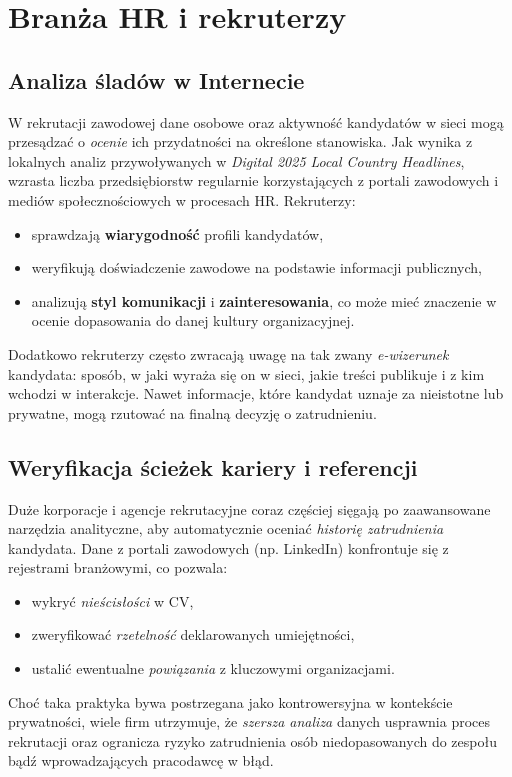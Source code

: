 \vspace{1em}

\section{Branża HR i rekruterzy}

\subsection{Analiza śladów w Internecie}
W rekrutacji zawodowej dane osobowe oraz aktywność kandydatów w sieci mogą przesądzać o \emph{ocenie} ich przydatności na określone stanowiska. Jak wynika z lokalnych analiz przywoływanych w \emph{Digital 2025 Local Country Headlines}\cite{DIGITAL_LOCAL}, wzrasta liczba przedsiębiorstw regularnie korzystających z portali zawodowych i mediów społecznościowych w procesach HR. Rekruterzy:
\begin{itemize}
    \item sprawdzają \textbf{wiarygodność} profili kandydatów,
    \item weryfikują doświadczenie zawodowe na podstawie informacji publicznych,
    \item analizują \textbf{styl komunikacji} i \textbf{zainteresowania}, co może mieć znaczenie w ocenie dopasowania do danej kultury organizacyjnej.
\end{itemize}

Dodatkowo rekruterzy często zwracają uwagę na tak zwany \emph{e-wizerunek} kandydata: sposób, w jaki wyraża się on w sieci, jakie treści publikuje i z kim wchodzi w interakcje. Nawet informacje, które kandydat uznaje za nieistotne lub prywatne, mogą rzutować na finalną decyzję o zatrudnieniu.

\subsection{Weryfikacja ścieżek kariery i referencji}
Duże korporacje i agencje rekrutacyjne coraz częściej sięgają po zaawansowane narzędzia analityczne, aby automatycznie oceniać \emph{historię zatrudnienia} kandydata. Dane z portali zawodowych (np. LinkedIn) konfrontuje się z rejestrami branżowymi, co pozwala:
\begin{itemize}
    \item wykryć \emph{nieścisłości} w CV,
    \item zweryfikować \emph{rzetelność} deklarowanych umiejętności,
    \item ustalić ewentualne \emph{powiązania} z kluczowymi organizacjami.
\end{itemize}
Choć taka praktyka bywa postrzegana jako kontrowersyjna w kontekście prywatności, wiele firm utrzymuje, że \emph{szersza analiza} danych usprawnia proces rekrutacji oraz ogranicza ryzyko zatrudnienia osób niedopasowanych do zespołu bądź wprowadzających pracodawcę w błąd.

